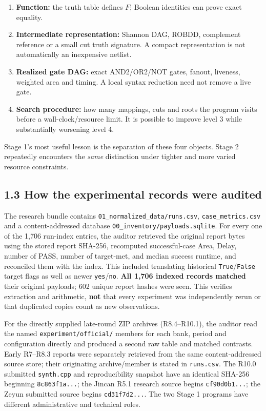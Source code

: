 \begin{enumerate}
\def\labelenumi{\arabic{enumi}.}
\tightlist
\item
  \textbf{Function:} the truth table defines \(F\); Boolean identities can prove exact equality.
\item
  \textbf{Intermediate representation:} Shannon DAG, ROBDD, complement reference or a small cut truth signature. A compact representation is not automatically an inexpensive netlist.
\item
  \textbf{Realized gate DAG:} exact AND2/OR2/NOT gates, fanout, liveness, weighted area and timing. A local syntax reduction need not remove a live gate.
\item
  \textbf{Search procedure:} how many mappings, cuts and roots the program visits before a wall-clock/resource limit. It is possible to improve level 3 while substantially worsening level 4.
\end{enumerate}

Stage 1's most useful lesson is the separation of these four objects. Stage 2 repeatedly encounters the \emph{same} distinction under tighter and more varied resource constraints.

\subsection{1.3 How the experimental records were audited}\label{how-the-experimental-records-were-audited}

The research bundle contains \texttt{01\_normalized\_data/runs.csv}, \texttt{case\_metrics.csv} and a content-addressed database \texttt{00\_inventory/payloads.sqlite}. For every one of the 1,706 run-index entries, the auditor retrieved the original report bytes using the stored report SHA-256, recomputed successful-case Area, Delay, number of PASS, number of target-met, and median success runtime, and reconciled them with the index. This included translating historical \texttt{True}/\texttt{False} target flags as well as newer \texttt{yes}/\texttt{no}. \textbf{All 1,706 indexed records matched} their original payloads; 602 unique report hashes were seen. This verifies extraction and arithmetic, \textbf{not} that every experiment was independently rerun or that duplicated copies count as new observations.

For the directly supplied late-round ZIP archives (R8.4--R10.1), the auditor read the named \texttt{experiment/official/} members for each bank, period and configuration directly and produced a second raw table and matched contrasts. Early R7--R8.3 reports were separately retrieved from the same content-addressed source store; their originating archive/member is stated in \texttt{runs.csv}. The R10.0 submitted \texttt{synth.cpp} and reproducibility snapshot have an identical SHA-256 beginning \texttt{8c863f1a...}; the Jincan R5.1 research source begins \texttt{cf90d0b1...}; the Zeyun submitted source begins \texttt{cd31f7d2...}. The two Stage 1 programs have different administrative and technical roles.

